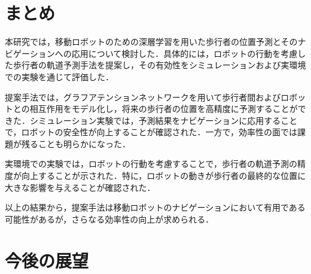 
\section{まとめ}
本研究では，移動ロボットのための深層学習を用いた歩行者の位置予測とそのナビゲーションへの応用について検討した．具体的には，ロボットの行動を考慮した歩行者の軌道予測手法を提案し，その有効性をシミュレーションおよび実環境での実験を通じて評価した．

提案手法では，グラフアテンションネットワークを用いて歩行者間およびロボットとの相互作用をモデル化し，将来の歩行者の位置を高精度に予測することができた．シミュレーション実験では，予測結果をナビゲーションに応用することで，ロボットの安全性が向上することが確認された．一方で，効率性の面では課題が残ることも明らかになった．

実環境での実験では，ロボットの行動を考慮することで，歩行者の軌道予測の精度が向上することが示された．特に，ロボットの動きが歩行者の最終的な位置に大きな影響を与えることが確認された．

以上の結果から，提案手法は移動ロボットのナビゲーションにおいて有用である可能性があるが，さらなる効率性の向上が求められる．

\section{今後の展望}

\newpage
